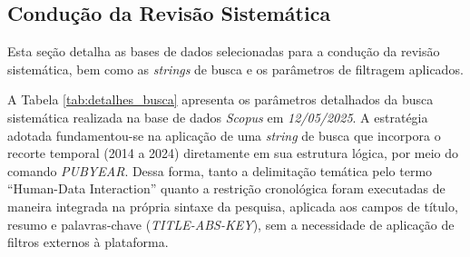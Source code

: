 \documentclass[
	12pt,				%
	oneside,			%
	a4paper,			%
	english,			%
	brazil				%
	]{abntex2ppgsi}
\begin{document}


 \subsection{Condução da Revisão Sistemática}

    Esta seção detalha as bases de dados selecionadas para a condução da revisão sistemática, bem como as \textit{strings} de busca e os parâmetros de filtragem aplicados.

    A Tabela \ref{tab:detalhes_busca} apresenta os parâmetros detalhados da busca sistemática realizada na base de dados \emph{Scopus} em \emph{12/05/2025}. A estratégia adotada fundamentou-se na aplicação de uma \textit{string} de busca que incorpora o recorte temporal (2014 a 2024) diretamente em sua estrutura lógica, por meio do comando \textit{PUBYEAR}. Dessa forma, tanto a delimitação temática pelo termo ``Human-Data Interaction'' quanto a restrição cronológica foram executadas de maneira integrada na própria sintaxe da pesquisa, aplicada aos campos de título, resumo e palavras-chave (\textit{TITLE-ABS-KEY}), sem a necessidade de aplicação de filtros externos à plataforma.
\end{document}
